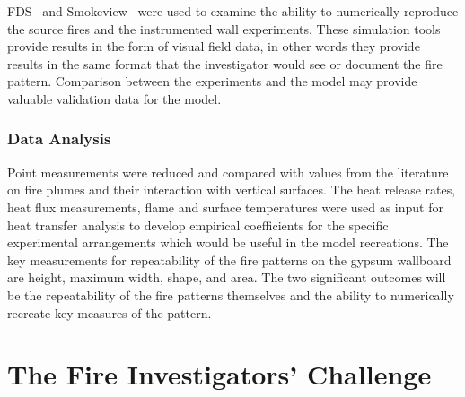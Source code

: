 \documentclass[twoside]{uocthesis}
\begin{document}
{FDS~\cite{McGrattan:2014} and Smokeview~\cite{Forney:2014} were used to examine the ability to numerically reproduce the source fires and the instrumented wall experiments. These simulation tools provide results in the form of visual field data, in other words they provide results in the same format that the investigator would see or document the fire pattern.  Comparison between the experiments and the model may provide valuable validation data for the model.

\subsubsection{Data Analysis}

Point measurements were reduced and compared with values from the literature on fire plumes and their interaction with vertical surfaces.  The heat release rates, heat flux measurements, flame and surface temperatures were used as input for heat transfer analysis to develop empirical coefficients for the specific experimental arrangements which would be useful in the model recreations.
The key measurements for repeatability of the fire patterns on the gypsum wallboard are height, maximum width, shape, and area.  The two significant outcomes will be the repeatability of the fire patterns themselves and the ability to numerically recreate key measures of the pattern.

\section{The Fire Investigators' Challenge}

}
\end{document}
